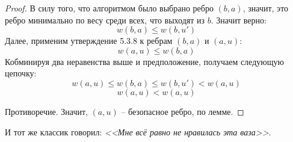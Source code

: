 \begin{proof}
    В силу того, что алгоритмом было выбрано ребро $(b, a)$, значит, это ребро минимально по весу среди всех, что выходят из $b$. Значит верно:
    \begin{equation*}
        w(b, a) \leq w(b, u')
    \end{equation*}
    Далее, применим утверждение 5.3.8 к ребрам $(b, a)$ и $(a, u)$:
    \begin{equation*}
        w(a, u) \leq w(b, a)
    \end{equation*}
    Кобминируя два неравенства выше и предположение, получаем следующую цепочку:
    \begin{equation*}
        w(a, u) \leq w(b, a) \leq w(b, u') < w(a, u)
    \end{equation*}
    \begin{equation*}
        w(a, u) < w(a, u)
    \end{equation*}

    Противоречие. Значит, $(a, u)$ -- безопасное ребро, по лемме.

\end{proof}

И тот же классик говорил: \textit{<<Мне всё равно не нравилась эта ваза>>}.

